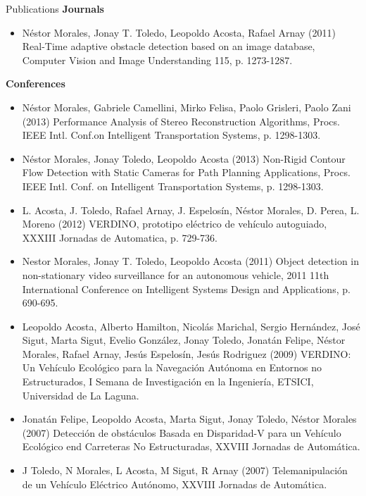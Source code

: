 \begin{frame}{Publications}
\tiny
\textbf{Journals}
\begin{itemize}
 \item Néstor Morales, Jonay T. Toledo, Leopoldo Acosta, Rafael Arnay (2011) Real-Time adaptive obstacle detection based on an image database, Computer Vision and Image Understanding 115, p. 1273-1287.
\end{itemize}
\textbf{Conferences}
\begin{itemize}
 \item Néstor Morales, Gabriele Camellini, Mirko Felisa, Paolo Grisleri, Paolo Zani (2013) Performance Analysis of Stereo Reconstruction Algorithms, Procs. IEEE Intl. Conf.on Intelligent Transportation Systems, p. 1298-1303.
 \item Néstor Morales, Jonay Toledo, Leopoldo Acosta (2013) Non-Rigid Contour Flow Detection with Static Cameras for Path Planning Applications, Procs. IEEE Intl. Conf. on Intelligent Transportation Systems, p. 1298-1303.
 \item L. Acosta, J. Toledo, Rafael Arnay, J. Espelosín, Néstor Morales, D. Perea, L. Moreno (2012) VERDINO, prototipo eléctrico de vehículo autoguiado, XXXIII Jornadas de Automatica, p. 729-736.
 \item Nestor Morales, Jonay T. Toledo, Leopoldo Acosta (2011) Object detection in non-stationary video surveillance for an autonomous vehicle, 2011 11th International Conference on Intelligent Systems Design and Applications, p. 690-695.
 \item Leopoldo Acosta, Alberto Hamilton, Nicolás Marichal, Sergio Hernández, José Sigut, Marta Sigut, Evelio González, Jonay Toledo, Jonatán Felipe, Néstor Morales, Rafael Arnay, Jesús Espelosín, Jesús Rodriguez (2009) VERDINO: Un Vehículo Ecológico para la Navegación Autónoma en Entornos no Estructurados, I Semana de Investigación en la Ingeniería, ETSICI, Universidad de La Laguna.
 \item Jonatán Felipe, Leopoldo Acosta, Marta Sigut, Jonay Toledo, Néstor Morales (2007) Detección de obstáculos Basada en Disparidad-V para un Vehículo Ecológico end Carreteras No Estructuradas, XXVIII Jornadas de Automática.
 \item J Toledo, N Morales, L Acosta, M Sigut, R Arnay (2007) Telemanipulación de un Vehículo Eléctrico Autónomo, XXVIII Jornadas de Automática.
\end{itemize}
\end{frame}

